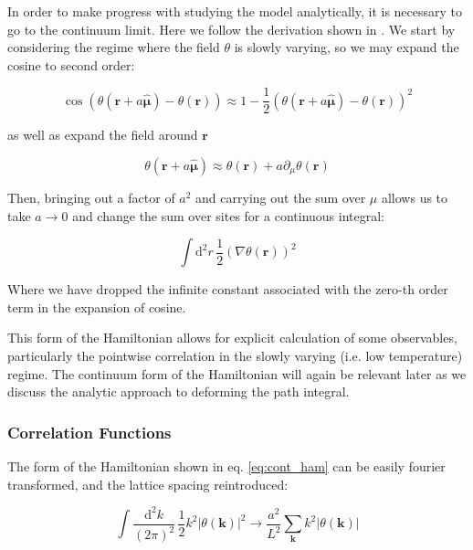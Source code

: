 \documentclass[12pt]{article}
\begin{document}
In order to make progress with studying the model analytically, it is necessary to go to the continuum limit. Here we follow the derivation shown in
\cite{drouintouchette2022kosterlitzthoulessphasetransitionintroduction}.
We start by considering the regime where the field $\theta$ is slowly varying, so we may expand the cosine to second order:

\begin{equation*}
	\cos(\theta(\mathbf{r}+a\hat{\pmb{\mu}})-\theta(\mathbf{\mathbf{r}})) \approx 1 - \frac{1}{2}\left( \theta(\mathbf{r}+a\hat{\pmb{\mu}})-\theta(\mathbf{\mathbf{r}}) \right)^2
\end{equation*}

as well as expand the field around $\mathbf{r}$

\begin{equation*}
	\theta(\mathbf{r}+a\hat{\pmb{\mu}}) \approx \theta(\mathbf{r}) + a\partial_{\mu}\theta(\mathbf{r})
\end{equation*}

Then, bringing out a factor of $a^2$ and carrying out the sum over $\mu$ allows us to take $a \rightarrow 0$ and change the sum over sites for a continuous integral:

\begin{equation}\label{eq:cont_ham}
	\int\mathrm{d}^2 r \, \frac{1}{2}\left( \nabla\theta(\mathbf{r}) \right)^2
\end{equation}

Where we have dropped the infinite constant associated with the zero-th order term in the expansion of cosine.

This form of the Hamiltonian allows for explicit calculation of some observables, particularly the pointwise correlation in the slowly varying (i.e. low temperature) regime.
The continuum form of the Hamiltonian will again be relevant later as we discuss the analytic approach to deforming the path integral.

\subsubsection{Correlation Functions}

The form of the Hamiltonian shown in eq. \ref{eq:cont_ham} can be easily fourier transformed, and the lattice spacing reintroduced:

\begin{equation*}
	\int \frac{\mathrm{d}^2 k}{(2\pi)^2} \, \frac{1}{2} k^2 \left|\theta(\mathbf{k})\right|^2 \rightarrow \frac{a^2}{L^2} \sum_{\mathbf{k}} k^2 \left| \theta(\mathbf{k}) \right|
\end{equation*}
\end{document}
